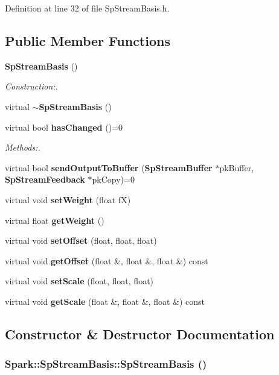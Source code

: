 Definition at line 32 of file Sp\-Stream\-Basis.h.\subsection*{Public Member Functions}
\begin{CompactItemize}
\item 
{\bf Sp\-Stream\-Basis} ()
\begin{CompactList}\small\item\em Construction:. \item\end{CompactList}\item 
virtual {\bf $\sim$Sp\-Stream\-Basis} ()
\item 
virtual bool {\bf has\-Changed} ()=0
\begin{CompactList}\small\item\em Methods:. \item\end{CompactList}\item 
virtual bool {\bf send\-Output\-To\-Buffer} ({\bf Sp\-Stream\-Buffer} $\ast$pk\-Buffer, {\bf Sp\-Stream\-Feedback} $\ast$pk\-Copy)=0
\item 
virtual void {\bf set\-Weight} (float f\-X)
\item 
virtual float {\bf get\-Weight} ()
\item 
virtual void {\bf set\-Offset} (float, float, float)
\item 
virtual void {\bf get\-Offset} (float \&, float \&, float \&) const
\item 
virtual void {\bf set\-Scale} (float, float, float)
\item 
virtual void {\bf get\-Scale} (float \&, float \&, float \&) const
\end{CompactItemize}


\subsection{Constructor \& Destructor Documentation}
\subsubsection{\setlength{\rightskip}{0pt plus 5cm}Spark::Sp\-Stream\-Basis::Sp\-Stream\-Basis ()\hspace{0.3cm}{\tt  [inline]}}\label{classSpark_1_1SpStreamBasis_a0}


